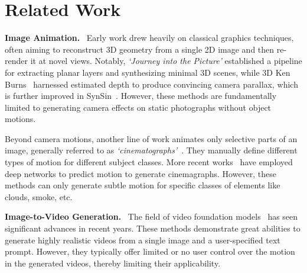 
\section{Related Work}
\label{sec-2-related-work}

\noindent \textbf{Image Animation.} \
Early work drew heavily on classical graphics techniques, often aiming to reconstruct 3D geometry from a single 2D image and then re-render it at novel views. Notably, \emph{`Journey into the Picture'} established a pipeline for extracting planar layers and synthesizing minimal 3D scenes, while 3D Ken Burns~\cite{niklaus3d} harnessed estimated depth to produce convincing camera parallax, which is further improved in SynSin~\cite{wiles2020synsin}.
However, these methods are fundamentally limited to generating camera effects on static photographs without object motions. 

Beyond camera motions, another line of work animates only selective parts of an image, generally referred to as \emph{`cinematographs'}~\cite{chuang2005animating}. They manually define different types of motion for different subject classes. More recent works~\cite{mahapatra2023synthesizing, holynski2021animating, fan2022SLR} have employed deep networks to predict motion to generate cinemagraphs. However, these methods can only generate subtle motion for specific classes of elements like clouds, smoke, etc.



\vspace*{1mm}
\noindent \textbf{Image-to-Video Generation.}  \
The field of video foundation models~\cite{blattmann2023stable,xing2023dynamicrafter,chen2023videocrafter1,videoworldsimulators2024,bar2024lumiere,polyak2024movie,yang2024cogvideox,hacohen2024ltx} has seen significant advances in recent years. These methods demonstrate great abilities to generate highly realistic videos from a single image and a user-specified text prompt. However, they typically offer limited or no user control over the motion in the generated videos, 
thereby limiting their applicability. 


